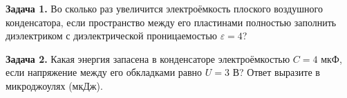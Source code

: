 
\begin{taskbasic}[code={\label{task:elem_cap_v1_n11}}]
\textbf{Задача 1.} Во сколько раз увеличится электроёмкость плоского воздушного конденсатора, если пространство между его пластинами полностью заполнить диэлектриком с диэлектрической проницаемостью $\varepsilon = 4$?

\end{taskbasic}

\begin{taskbasic}[code={\label{task:elem_cap_v2_n11}}]
\textbf{Задача 2.} Какая энергия запасена в конденсаторе электроёмкостью $C = 4\text{ мкФ}$, если напряжение между его обкладками равно $U = 3\text{ В}$? Ответ выразите в микроджоулях (мкДж).

\end{taskbasic}

